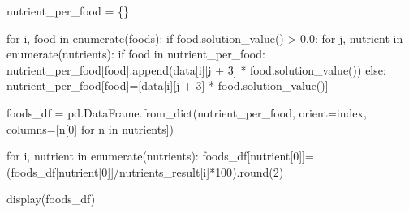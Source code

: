 \documentclass[
  ignorenonframetext,
]{beamer}
\newenvironment{Shaded}{\begin{snugshade}}{\end{snugshade}}
\newcommand{\BuiltInTok}[1]{\textcolor[rgb]{0.00,0.23,0.31}{#1}}
\newcommand{\ControlFlowTok}[1]{\textcolor[rgb]{0.00,0.23,0.31}{#1}}
\newcommand{\DecValTok}[1]{\textcolor[rgb]{0.68,0.00,0.00}{#1}}
\newcommand{\FloatTok}[1]{\textcolor[rgb]{0.68,0.00,0.00}{#1}}
\newcommand{\KeywordTok}[1]{\textcolor[rgb]{0.00,0.23,0.31}{#1}}
\newcommand{\NormalTok}[1]{\textcolor[rgb]{0.00,0.23,0.31}{#1}}
\newcommand{\OperatorTok}[1]{\textcolor[rgb]{0.37,0.37,0.37}{#1}}
\newcommand{\StringTok}[1]{\textcolor[rgb]{0.13,0.47,0.30}{#1}}
\begin{document}
\begin{frame}[fragile]
\begin{Shaded}
\begin{Highlighting}[]
\NormalTok{nutrient\_per\_food }\OperatorTok{=}\NormalTok{ \{\}}

\ControlFlowTok{for}\NormalTok{ i, food }\KeywordTok{in} \BuiltInTok{enumerate}\NormalTok{(foods):}
    \ControlFlowTok{if}\NormalTok{ food.solution\_value() }\OperatorTok{\textgreater{}} \FloatTok{0.0}\NormalTok{:      }
        \ControlFlowTok{for}\NormalTok{ j, nutrient }\KeywordTok{in} \BuiltInTok{enumerate}\NormalTok{(nutrients):}
            \ControlFlowTok{if}\NormalTok{ food }\KeywordTok{in}\NormalTok{ nutrient\_per\_food:}
\NormalTok{                nutrient\_per\_food[food].append(data[i][j }\OperatorTok{+} \DecValTok{3}\NormalTok{] }\OperatorTok{*}\NormalTok{ food.solution\_value())}
            \ControlFlowTok{else}\NormalTok{:}
\NormalTok{                nutrient\_per\_food[food]}\OperatorTok{=}\NormalTok{[data[i][j }\OperatorTok{+} \DecValTok{3}\NormalTok{] }\OperatorTok{*}\NormalTok{ food.solution\_value()]}
                
\NormalTok{foods\_df }\OperatorTok{=}\NormalTok{ pd.DataFrame.from\_dict(nutrient\_per\_food, orient}\OperatorTok{=}\StringTok{\textquotesingle{}index\textquotesingle{}}\NormalTok{, columns}\OperatorTok{=}\NormalTok{[n[}\DecValTok{0}\NormalTok{] }\ControlFlowTok{for}\NormalTok{ n }\KeywordTok{in}\NormalTok{ nutrients])}

\ControlFlowTok{for}\NormalTok{ i, nutrient }\KeywordTok{in} \BuiltInTok{enumerate}\NormalTok{(nutrients):}
\NormalTok{    foods\_df[nutrient[}\DecValTok{0}\NormalTok{]]}\OperatorTok{=}\NormalTok{(foods\_df[nutrient[}\DecValTok{0}\NormalTok{]]}\OperatorTok{/}\NormalTok{nutrients\_result[i]}\OperatorTok{*}\DecValTok{100}\NormalTok{).}\BuiltInTok{round}\NormalTok{(}\DecValTok{2}\NormalTok{)}

\NormalTok{display(foods\_df)                 }
\end{Highlighting}
\end{Shaded}


\end{frame}
\end{document}
